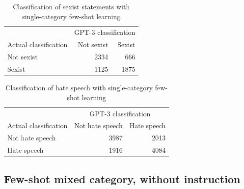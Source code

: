 \documentclass[12pt,]{article}
\begin{document}
\begin{table}[!h]

\caption{\label{tab:fewshotsingle-sexism}Classification of sexist statements with single-category few-shot learning}
\centering
\fontsize{8}{10}\selectfont
\begin{tabular}[t]{lrr}
\toprule
\multicolumn{1}{c}{ } & \multicolumn{2}{c}{GPT-3 classification} \\
\cmidrule(l{3pt}r{3pt}){2-3}
Actual classification & Not sexist & Sexist\\
\midrule
Not sexist & 2334 & 666\\
Sexist & 1125 & 1875\\
\bottomrule
\end{tabular}
\end{table}

\begin{table}[!h]

\caption{\label{tab:fewshotsingle-hate}Classification of hate speech with single-category few-shot learning}
\centering
\fontsize{8}{10}\selectfont
\begin{tabular}[t]{lrr}
\toprule
\multicolumn{1}{c}{ } & \multicolumn{2}{c}{GPT-3 classification} \\
\cmidrule(l{3pt}r{3pt}){2-3}
Actual classification & Not hate speech & Hate speech\\
\midrule
Not hate speech & 3987 & 2013\\
Hate speech & 1916 & 4084\\
\bottomrule
\end{tabular}
\end{table}

\newpage

\hypertarget{appendxbmuxedubsnorinstruction}{%
\subsection{Few-shot mixed category, without instruction}\label{appendxbmuxedubsnorinstruction}}
\end{document}
